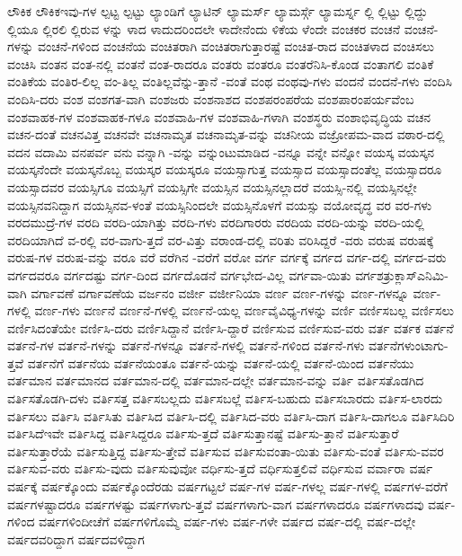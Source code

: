 {ಲೌಕಿಕ
ಲೌಕಿಕಇವು-ಗಳ
ಲ್ಪಟ್ಟ
ಲ್ಪಟ್ಟು
ಲ್ಯಾಂಡಿಗೆ
ಲ್ಯಾಟಿನ್
ಲ್ಯಾಮರ್ಸ್
ಲ್ಯಾಮರ್ಸ್ಗೆ
ಲ್ಯಾಮರ್ಸ್ನ
ಲ್ಲಿ
ಲ್ಲಿಟ್ಟು
ಲ್ಲಿದ್ದು
ಲ್ಲಿಯೂ
ಲ್ಲಿರಲಿ
ಲ್ಲಿರುವ
ಳನ್ನು
ಳಾದ
ಳಾದುದರಿಂದಲೇ
ಳಾದೇನೆಂದು
ಳಿಕೆಯ
ಳೆಂದೇ
ವಂಚಕರ
ವಂಚನೆ
ವಂಚನೆ-ಗಳನ್ನು
ವಂಚನೆ-ಗಳಿಂದ
ವಂಚನೆಯ
ವಂಚಿತರಾಗಿ
ವಂಚಿತರಾಗುತ್ತಾರಷ್ಟೆ
ವಂಚಿತ-ರಾದ
ವಂಚಿತಳಾದ
ವಂಚಿಸಲು
ವಂಚಿಸಿ
ವಂತನ
ವಂತ-ನಲ್ಲಿ
ವಂತನೆ
ವಂತ-ರಾದರೂ
ವಂತರು
ವಂತರೂ
ವಂತರೆನಿಸಿ-ಕೊಂಡ
ವಂತಾಗಲಿ
ವಂತಿಕೆ
ವಂತಿಕೆಯ
ವಂತಿರ-ಲಿಲ್ಲ
ವಂ-ತಿಲ್ಲ
ವಂತಿಲ್ಲವೆನ್ನು-ತ್ತಾನೆ
-ವಂತೆ
ವಂಥ
ವಂಥವು-ಗಳು
ವಂದನೆ
ವಂದನೆ-ಗಳು
ವಂದಿಸಿ
ವಂದಿಸಿ-ದರು
ವಂಶ
ವಂಶಗತ-ವಾಗಿ
ವಂಶಜರು
ವಂಶನಾಶದ
ವಂಶಪರಂಪರೆಯ
ವಂಶಪಾರಂಪರ್ಯವೆಂಬ
ವಂಶವಾಹಕ-ಗಳ
ವಂಶವಾಹಕ-ಗಳೂ
ವಂಶವಾಹಿ-ಗಳ
ವಂಶವಾಹಿ-ಗಳಾಗಿ
ವಂಶಸ್ಥರು
ವಂಶಾಭಿವೃದ್ಧಿಯ
ವಚನ
ವಚನ-ದಂತೆ
ವಚನವಿತ್ತ
ವಚನವೇ
ವಚನಾಮೃತ
ವಚನಾಮೃತ-ವನ್ನು
ವಚನೀಯ
ವಜ್ರೋಪಮ-ವಾದ
ವಠಾರ-ದಲ್ಲಿ
ವದನ
ವದಾಮಿ
ವನಪರ್ವ
ವನು
ವನ್ನಾಗಿ
-ವನ್ನು
ವನ್ನುಂಟುಮಾಡಿದ
-ವನ್ನೂ
ವನ್ನೇ
ವನ್ನೋ
ವಯಸ್ಕ
ವಯಸ್ಕನ
ವಯಸ್ಕನೆಂದೇ
ವಯಸ್ಕನೊಬ್ಬ
ವಯಸ್ಕರ
ವಯಸ್ಕರೂ
ವಯಸ್ಸಾಗುತ್ತ
ವಯಸ್ಸಾದ
ವಯಸ್ಸಾದಂತೆಲ್ಲ
ವಯಸ್ಸಾದರೂ
ವಯಸ್ಸಾದವರ
ವಯಸ್ಸಿಗೂ
ವಯಸ್ಸಿಗೆ
ವಯಸ್ಸಿಗೇ
ವಯಸ್ಸಿನ
ವಯಸ್ಸಿನಲ್ಲಾದರೆ
ವಯಸ್ಸಿ-ನಲ್ಲಿ
ವಯಸ್ಸಿನಲ್ಲೇ
ವಯಸ್ಸಿನವನಿದ್ದಾಗ
ವಯಸ್ಸಿನವ-ಳಂತೆ
ವಯಸ್ಸಿನಿಂದಲೇ
ವಯಸ್ಸಿನೊಳಗೆ
ವಯಸ್ಸು
ವಯೋವೃದ್ಧ
ವರ
ವರ-ಗಳು
ವರದಮುದ್ರೆ-ಗಳ
ವರದಿ
ವರದಿ-ಯಾಗಿತ್ತು
ವರದಿ-ಗಳು
ವರದಿಗಾರರು
ವರದಿಯ
ವರದಿ-ಯನ್ನು
ವರದಿ-ಯಲ್ಲಿ
ವರದಿಯಾಗಿದೆ
ವ-ರಲ್ಲಿ
ವರ-ವಾಗು-ತ್ತದೆ
ವರ-ವಿತ್ತು
ವರಾಂಡ-ದಲ್ಲಿ
ವರಿತು
ವರಿಸಿದ್ದರೆ
-ವರು
ವರುಷ
ವರುಷಕ್ಕೆ
ವರುಷ-ಗಳ
ವರುಷ-ವನ್ನು
ವರೂ
ವರೆ
ವರೆಗಿನ
-ವರೆಗೆ
ವರೋ
ವರ್ಗ
ವರ್ಗಕ್ಕೆ
ವರ್ಗದ
ವರ್ಗ-ದಲ್ಲಿ
ವರ್ಗದ-ವರು
ವರ್ಗದವರೂ
ವರ್ಗದಷ್ಟು
ವರ್ಗ-ದಿಂದ
ವರ್ಗದೊಡನೆ
ವರ್ಗಭೇದ-ವಿಲ್ಲ
ವರ್ಗವಾ-ಯಿತು
ವರ್ಗಶತ್ರುಕ್ಲಾಸ್ಎನಿಮಿ-ವಾಗಿ
ವರ್ಗಾವಣೆ
ವರ್ಗಾವಣೆಯ
ವರ್ಜನಂ
ವರ್ಜೀ
ವರ್ಜೀನಿಯಾ
ವರ್ಣ
ವರ್ಣ-ಗಳನ್ನು
ವರ್ಣ-ಗಳನ್ನೂ
ವರ್ಣ-ಗಳಲ್ಲಿ
ವರ್ಣ-ಗಳು
ವರ್ಣನೆ
ವರ್ಣನೆ-ಗಳಲ್ಲಿ
ವರ್ಣನೆ-ಯಲ್ಲ
ವರ್ಣವೈವಿಧ್ಯ-ಗಳನ್ನು
ವರ್ಣಿ
ವರ್ಣಿಸಬಲ್ಲ
ವರ್ಣಿಸಲು
ವರ್ಣಿಸಿದಂತೆಯೇ
ವರ್ಣಿಸಿ-ದರು
ವರ್ಣಿಸಿದ್ದಾನೆ
ವರ್ಣಿಸಿ-ದ್ದಾರೆ
ವರ್ಣಿಸುವ
ವರ್ಣಿಸುವ-ವರು
ವರ್ತ
ವರ್ತಕ
ವರ್ತನೆ
ವರ್ತನೆ-ಗಳ
ವರ್ತನೆ-ಗಳನ್ನು
ವರ್ತನೆ-ಗಳನ್ನೂ
ವರ್ತನೆ-ಗಳಲ್ಲಿ
ವರ್ತನೆ-ಗಳಿಂದ
ವರ್ತನೆ-ಗಳು
ವರ್ತನೆಗಳುಂಟಾಗು-ತ್ತವೆ
ವರ್ತನೆಗೆ
ವರ್ತನೆಯ
ವರ್ತನೆಯಂತೂ
ವರ್ತನೆ-ಯನ್ನು
ವರ್ತನೆ-ಯಲ್ಲಿ
ವರ್ತನೆ-ಯಿಂದ
ವರ್ತನೆಯು
ವರ್ತಮಾನ
ವರ್ತಮಾನದ
ವರ್ತಮಾನ-ದಲ್ಲಿ
ವರ್ತಮಾನ-ದಲ್ಲೇ
ವರ್ತಮಾನ-ವನ್ನು
ವರ್ತಿ
ವರ್ತಿಸತೊಡಗಿದ
ವರ್ತಿಸತೊಡಗಿ-ದಳು
ವರ್ತಿಸತ್ತ
ವರ್ತಿಸಬಲ್ಲದು
ವರ್ತಿಸಬಲ್ಲೆ
ವರ್ತಿಸ-ಬಹುದು
ವರ್ತಿಸಬಾರದು
ವರ್ತಿಸ-ಲಾರದು
ವರ್ತಿಸಲು
ವರ್ತಿಸಿ
ವರ್ತಿಸಿತು
ವರ್ತಿಸಿದ
ವರ್ತಿಸಿ-ದಲ್ಲಿ
ವರ್ತಿಸಿದ-ವರು
ವರ್ತಿಸಿ-ದಾಗ
ವರ್ತಿಸಿ-ದಾಗಲೂ
ವರ್ತಿಸಿದಿರಿ
ವರ್ತಿಸಿದೆಇವೇ
ವರ್ತಿಸಿದ್ದ
ವರ್ತಿಸಿದ್ದರೂ
ವರ್ತಿಸು-ತ್ತದೆ
ವರ್ತಿಸುತ್ತಾನಷ್ಟೆ
ವರ್ತಿಸು-ತ್ತಾನೆ
ವರ್ತಿಸುತ್ತಾರೆ
ವರ್ತಿಸುತ್ತಾರೆಯೆ
ವರ್ತಿಸುತ್ತಿದ್ದ
ವರ್ತಿಸು-ತ್ತೇವೆ
ವರ್ತಿಸುವ
ವರ್ತಿಸುವಂತಾ-ಯಿತು
ವರ್ತಿಸು-ವಂತೆ
ವರ್ತಿಸು-ವವರ
ವರ್ತಿಸುವ-ವರು
ವರ್ತಿಸು-ವುದು
ವರ್ತಿಸುವುವೋ
ವರ್ಧಿಸು-ತ್ತದೆ
ವರ್ಧಿಸುತ್ತಲಿವೆ
ವರ್ಧಿಸುವ
ವರ್ವಾರಾ
ವರ್ಷ
ವರ್ಷಕ್ಕೆ
ವರ್ಷಕ್ಕೊಂದು
ವರ್ಷಕ್ಕೊಂದೆರಡು
ವರ್ಷಗಟ್ಟಲೆ
ವರ್ಷ-ಗಳ
ವರ್ಷ-ಗಳಲ್ಲ
ವರ್ಷ-ಗಳಲ್ಲಿ
ವರ್ಷಗಳ-ವರೆಗೆ
ವರ್ಷಗಳಷ್ಟಾದರೂ
ವರ್ಷಗಳಷ್ಟು
ವರ್ಷಗಳಾಗು-ತ್ತವೆ
ವರ್ಷಗಳಾಗು-ವಾಗ
ವರ್ಷಗಳಾದರೂ
ವರ್ಷಗಳಾದವು
ವರ್ಷ-ಗಳಿಂದ
ವರ್ಷಗಳಿಂದೀಚೆಗೆ
ವರ್ಷಗಳಿಗೊಮ್ಮೆ
ವರ್ಷ-ಗಳು
ವರ್ಷ-ಗಳೇ
ವರ್ಷದ
ವರ್ಷ-ದಲ್ಲಿ
ವರ್ಷ-ದಲ್ಲೇ
ವರ್ಷದವರಿದ್ದಾಗ
ವರ್ಷದವಳಿದ್ದಾಗ
}
